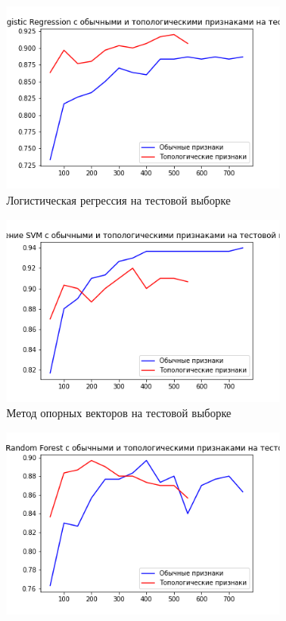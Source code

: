 \documentclass{beamer}
\begin{document}
\begin{frame}
\begin{figure}[!htbp]
				\begin{subfigure}{0.25\textwidth}
					\includegraphics[width=\linewidth]{log_diff_features_test.png}
					\caption{Логистическая регрессия на тестовой выборке}
					\label{fig:4}
				\end{subfigure}\hfil %
				\begin{subfigure}{0.25\textwidth}
					\includegraphics[width=\linewidth]{svm_diff_features_test.png}
					\caption{Метод опорных векторов на тестовой выборке}
					\label{fig:5}
				\end{subfigure}\hfil %
				\begin{subfigure}{0.25\textwidth}
					\includegraphics[width=\linewidth]{rf_diff_features_test.png}

\end{subfigure}
\end{figure}
\end{frame}
\end{document}
